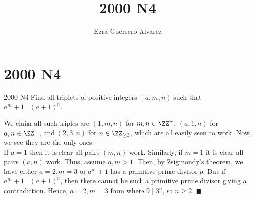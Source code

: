\documentclass[14pt]{article}
\title{2000 N4}
\author{Ezra Guerrero Alvarez}
\begin{document}
\maketitle
	
\section*{2000 N4}

\begin{statement}{2000 N4}
	Find all triplets of positive integers $ (a,m,n)$ such that  $ a^m + 1 \mid (a + 1)^n$.
\end{statement}
We claim all such triples are $(1,m,n)$ for $m,n\in\ZZ^+$, $(a,1,n)$ for $a,n\in\ZZ^+$, and $(2,3,n)$ for $n\in\ZZ_{\ge2}$, which are all easily seen to work. Now, we see they are the only ones.\\
If $a=1$ then it is clear all pairs $(m,n)$ work. Similarly, if $m=1$ it is clear all pairs $(a,n)$ work. Thus, assume $a,m>1$. Then, by Zsigmondy's theorem, we have either $a=2,m=3$ or $a^m+1$ has a primitive prime divisor $p$. But if $a^m+1\mid(a+1)^n$, then there cannot be such a primitive prime divisor giving a contradiction. Hence, $a=2,m=3$ from where $9\mid3^n$, so $n\ge2$. $\blacksquare$
	
\end{document}
